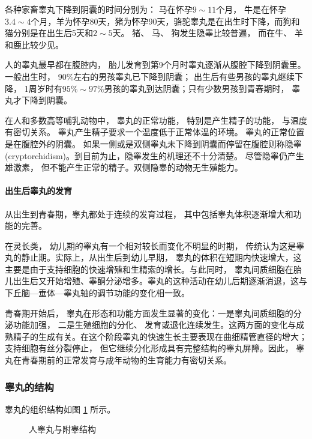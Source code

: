 各种家畜睾丸下降到阴囊的时间分别为： 马在怀孕$ 9 \sim 11 $个月， 牛是在怀孕$ 3.4 \sim 4 $个月，羊为怀孕80天，猪为怀孕90天，骆驼睾丸是在出生时下降，而狗和猫分别是在出生后5天和$ 2 \sim 5 $天。 猪、 马、 狗发生隐睾比较普遍， 而在牛、 羊和鹿比较少见。

 人的睾丸最早都在腹腔内， 胎儿发育到第9个月时睾丸逐渐从腹腔下降到阴囊里。 一般出生时， 90\%左右的男孩睾丸已下降到阴囊； 出生后有些男孩的睾丸继续下降， 1周岁时有$ 95\% \sim 97\% $男孩的睾丸到达阴囊；只有少数男孩到青春期时， 睾丸才下降到阴囊。
 
在人和多数高等哺乳动物中， 睾丸的正常功能， 特别是产生精子的功能， 与温度有密切关系。 睾丸产生精子要求一个温度低于正常体温的环境。 睾丸的正常位置是在腹腔外的阴囊。 如果一侧或是双侧睾丸未下降到阴囊而停留在腹腔则称隐睾 (cryp­torchidism)。到目前为止，隐睾发生的机理还不十分清楚。 尽管隐睾仍产生雄激素， 但不能产生正常的精子。双侧隐睾的动物无生殖能力。

\paragraph{出生后睾丸的发育}

从出生到青春期，睾丸都处于连续的发育过程， 其中包括睾丸体积逐渐增大和功能的完善。

在灵长类， 幼儿期的睾丸有一个相对较长而变化不明显的时期， 传统认为这是睾丸的静止期。实际上，从出生后到幼儿早期， 睾丸的体积在短期内快速增大，这主要是由于支持细胞的快速增殖和生精索的增长。与此同时， 睾丸间质细胞在胎儿出生后又开始增殖、睾酮分泌增多。睾丸的这种活动在幼儿后期逐渐消退，这与下丘脑---垂体---睾丸轴的调节功能的变化相一致。

青春期开始后， 睾丸在形态和功能方面发生显著的变化：一是睾丸间质细胞的分泌功能加强， 二是生殖细胞的分化、 发育或退化连续发生。这两方面的变化与成熟精子的生成有关。在这个阶段睾丸的快速生长主要表现在曲细精管直径的增大；支持细胞有丝分裂停止， 但它继续分化形成具有完整结构的睾丸屏障。因此， 睾丸在青春期前的正常发育与成年动物的生育能力有密切关系。

\subsubsection{睾丸的结构}

睾丸的组织结构如图 \ref{figure_structure_of_human_testis_and_epididymis} 所示。

\begin{figure}
\centering
\myFigurePlaceholder
\caption{人睾丸与附睾结构}
\label{figure_structure_of_human_testis_and_epididymis}
\end{figure}


